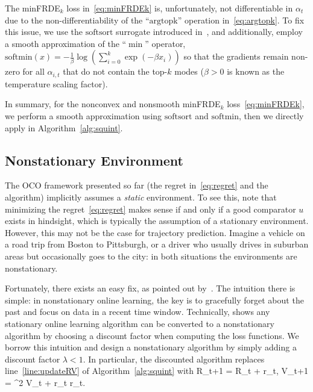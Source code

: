 The minFRDE$_k$ loss in~\eqref{eq:minFRDEk} is, unfortunately, not differentiable in $\alpha_t$ due to the non-differentiability of the ``$\mathrm{argtopk}$'' operation in~\eqref{eq:argtopk}. To fix this issue, we use the $\mathrm{softsort}$ surrogate introduced in~\cite{prillo2020softsort}, and additionally, employ a smooth approximation of the ``$\min$'' operator, \ie
$
\mathrm{softmin}(x) = -\frac{1}{\beta} \log\left(\sum_{i=0}^k \exp(-\beta x_i)\right) 
$
so that the gradients remain non-zero for all $\alpha_{i,t}$ that do not contain the top-$k$ modes ($\beta>0$ is known as the temperature scaling factor). 

In summary, for the nonconvex and nonsmooth minFRDE$_k$ loss~\eqref{eq:minFRDEk}, we perform a smooth approximation using $\mathrm{softsort}$ and $\mathrm{softmin}$, then we directly apply \squint in Algorithm~\ref{alg:squint}.


\subsection{Nonstationary Environment}
\label{sec:nonstationary}

The OCO framework presented so far (\ie the regret in~\eqref{eq:regret} and the \squint algorithm) implicitly assumes a \emph{static} environment. To see this, note that minimizing the regret~\eqref{eq:regret} makes sense if and only if a good comparator $u$ exists in hindsight, which is typically the assumption of a stationary environment. However, this may not be the case for trajectory prediction. Imagine a vehicle on a road trip from Boston to Pittsburgh, or a driver who usually drives in suburban areas but occasionally goes to the city: in both situations the environments are nonstationary. 

Fortunately, there exists an easy fix, as pointed out by~\cite{zhang2024discountedn}. The intuition there is simple: in nonstationary online learning, the key is to gracefully forget about the past and focus on data in a recent time window. Technically, \cite{zhang2024discountedn} shows any stationary online learning algorithm can be converted to a nonstationary algorithm by choosing a discount factor when computing the loss functions. We borrow this intuition and design a nonstationary algorithm by simply adding a discount factor $\lambda < 1$. In particular, the discounted \squint algorithm replaces line~\ref{line:updateRV} of Algorithm~\ref{alg:squint} with
\bea \label{eq:discounted-squint}
R_{t+1} = \lambda R_t + r_t, \quad V_{t+1} = \lambda^2 V_t + r_t \circ r_t.
\eea 
